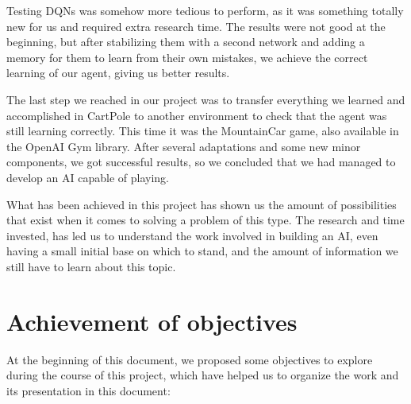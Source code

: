 Testing DQNs was somehow more tedious to perform, as it was something totally new for us and required extra research time. The results were not good at the beginning, but after stabilizing them with a second network and adding a memory for them to learn from their own mistakes, we achieve the correct learning of our agent, giving us better results.

The last step we reached in our project was to transfer everything we learned and accomplished in CartPole to another environment to check that the agent was still learning correctly. This time it was the MountainCar game, also available in the OpenAI Gym library. After several adaptations and some new minor components, we got successful results, so we concluded that we had managed to develop an AI capable of playing.

What has been achieved in this project has shown us the amount of possibilities that exist when it comes to solving a problem of this type. The research and time invested, has led us to understand the work involved in building an AI, even having a small initial base on which to stand, and the amount of information we still have to learn about this topic.

\section{Achievement of objectives}

At the beginning of this document, we proposed some objectives to explore during the course of this project, which have helped us to organize the work and its presentation in this document:

